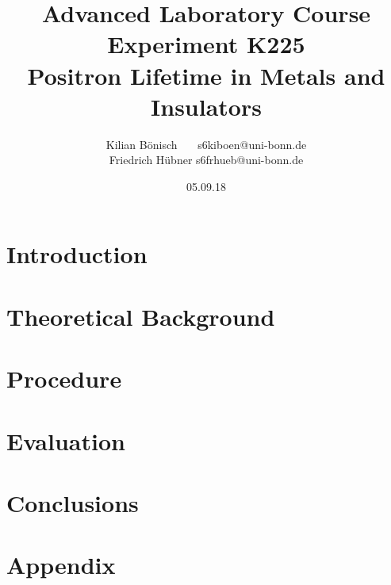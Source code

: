\documentclass{article}
\begin{document}
\setlength{\parindent}{0em}   %
\title{Advanced Laboratory Course\\Experiment K225\\Positron Lifetime in Metals and Insulators}
\author{Kilian Bönisch \ \ \ \qquad s6kiboen@uni-bonn.de \\
  Friedrich Hübner \qquad s6frhueb@uni-bonn.de }
\date{05.09.18}

\maketitle
\thispagestyle{empty}

\newpage

\thispagestyle{empty}

\tableofcontents

\newpage

\section{Introduction}



\section{Theoretical Background}



\section{Procedure}



\section{Evaluation}



\newpage

\section{Conclusions}



\FloatBarrier

\newpage

\printbibliography

\newpage

\section{Appendix}

\end{document}
